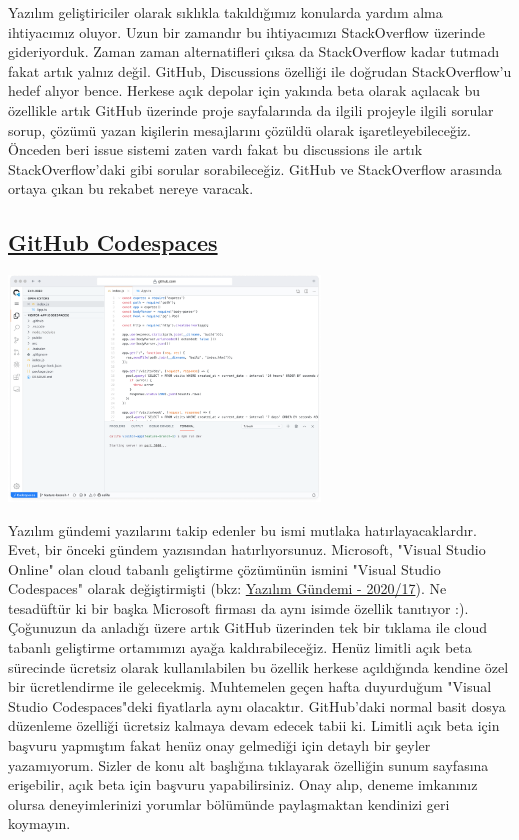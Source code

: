 \documentclass[11pt]{article}
\begin{document}
Yazılım geliştiriciler olarak sıklıkla takıldığımız konularda yardım alma
ihtiyacımız oluyor. Uzun bir zamandır bu ihtiyacımızı StackOverflow üzerinde
gideriyorduk. Zaman zaman alternatifleri çıksa da StackOverflow kadar tutmadı
fakat artık yalnız değil. GitHub, Discussions özelliği ile doğrudan
StackOverflow'u hedef alıyor bence. Herkese açık depolar için yakında beta
olarak açılacak bu özellikle artık GitHub üzerinde proje sayfalarında da
ilgili projeyle ilgili sorular sorup, çözümü yazan kişilerin mesajlarını
çözüldü olarak işaretleyebileceğiz. Önceden beri issue sistemi zaten vardı
fakat bu discussions ile artık StackOverflow'daki gibi sorular sorabileceğiz.
GitHub ve StackOverflow arasında ortaya çıkan bu rekabet nereye varacak.
\subsection{\href{https://github.com/features/codespaces/}{GitHub Codespaces}}
\label{sec:orgf1170a0}
\begin{center}
\includegraphics[height=6cm]{gorseller/github-codespaces.png}
\end{center}

Yazılım gündemi yazılarını takip edenler bu ismi mutlaka hatırlayacaklardır.
Evet, bir önceki gündem yazısından hatırlıyorsunuz. Microsoft, "Visual Studio
Online" olan cloud tabanlı geliştirme çözümünün ismini "Visual Studio
Codespaces" olarak değiştirmişti (bkz: \href{../17/yazilim-gundemi-2020-17.pdf}{Yazılım Gündemi - 2020/17}). Ne
tesadüftür ki bir başka Microsoft firması da aynı isimde özellik tanıtıyor
:). Çoğunuzun da anladığı üzere artık GitHub üzerinden tek bir tıklama ile
cloud tabanlı geliştirme ortamımızı ayağa kaldırabileceğiz. Henüz limitli
açık beta sürecinde ücretsiz olarak kullanılabilen bu özellik herkese
açıldığında kendine özel bir ücretlendirme ile gelecekmiş. Muhtemelen geçen
hafta duyurduğum "Visual Studio Codespaces"deki fiyatlarla aynı olacaktır.
GitHub'daki normal basit dosya düzenleme özelliği ücretsiz kalmaya devam
edecek tabii ki. Limitli açık beta için başvuru yapmıştım fakat henüz onay
gelmediği için detaylı bir şeyler yazamıyorum. Sizler de konu alt başlığına
tıklayarak özelliğin sunum sayfasına erişebilir, açık beta için başvuru
yapabilirsiniz. Onay alıp, deneme imkanınız olursa deneyimlerinizi yorumlar
bölümünde paylaşmaktan kendinizi geri koymayın.
\end{document}
